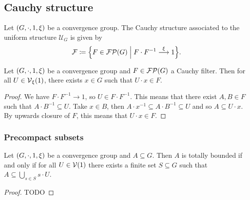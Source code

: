 \subsection{Cauchy structure}
\begin{lemma}
Let $\sSet{G, \cdot, 1, \xi}$ be a convergence group. The Cauchy structure associated to the uniform structure $\mathcal{U}_G$ is given by
\[ \mathcal{F} \defeq \setbuilder{F\in \powerfilters(G)}{F\cdot F^{-1} \overset{\xi}{\longrightarrow} 1}. \]
\end{lemma}

\begin{lemma} \label{vicinitiesOfUnitCauchyFilters}
Let $\sSet{G, \cdot, 1, \xi}$ be a convergence group and $F\in\operatorname{\mathcal{FP}}(G)$ a Cauchy filter. Then for all $U\in \operatorname{\mathcal{V}}_\xi(1)$, there exists $x\in G$ such that $U\cdot x\in F$.
\end{lemma}
\begin{proof}
We have $F\cdot F^{-1} \to 1$, so $U\in F\cdot F^{-1}$.
This means that there exist $A, B \in F$ such that $A\cdot B^{-1} \subseteq U$. Take $x \in B$, then $A\cdot x^{-1} \subseteq A\cdot B^{-1} \subseteq U$ and so $A \subseteq U\cdot x$. 
By upwards closure of $F$, this means that $U\cdot x\in F$.
\end{proof}

\subsubsection{Precompact subsets}

\begin{proposition}
Let $\sSet{G, \cdot, 1, \xi}$ be a convergence group and $A\subseteq G$. Then $A$ is totally bounded \textup{if and only if} for all $U\in \operatorname{\mathcal{V}}(1)$ there exists a finite set $S\subseteq G$ such that $A \subseteq \bigcup_{s\in S}s\cdot U$.
\end{proposition}
\begin{proof}
TODO
\end{proof}

